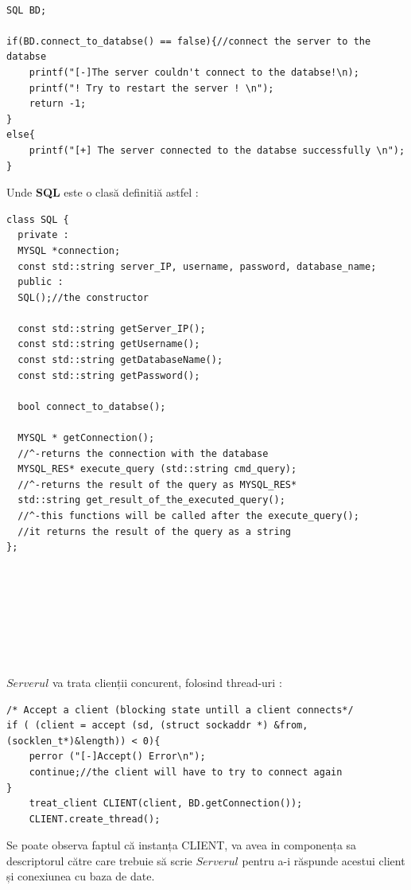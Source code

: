 \documentclass[runningheads]{llncs}
\begin{document}
\begin{verbatim} 

SQL BD;

if(BD.connect_to_databse() == false){//connect the server to the databse
    printf("[-]The server couldn't connect to the databse!\n);
    printf("! Try to restart the server ! \n");
    return -1;
}
else{
    printf("[+] The server connected to the databse successfully \n");
}
\end{verbatim} 
Unde \textbf{SQL} este o clasă definitiă astfel : 
\begin{verbatim}
class SQL {
  private :
  MYSQL *connection;
  const std::string server_IP, username, password, database_name;
  public :
  SQL();//the constructor
  
  const std::string getServer_IP();
  const std::string getUsername();
  const std::string getDatabaseName();
  const std::string getPassword();

  bool connect_to_databse();
  
  MYSQL * getConnection();
  //^-returns the connection with the database
  MYSQL_RES* execute_query (std::string cmd_query);
  //^-returns the result of the query as MYSQL_RES*
  std::string get_result_of_the_executed_query();
  //^-this functions will be called after the execute_query();
  //it returns the result of the query as a string
};
\end{verbatim}
 \\
  \\
   \\
    \\
     \\  
      \\
       \\
\hypertarget{sec:ServerCreateThread}{$Serverul $} va trata clienții concurent, folosind thread-uri : 
\begin{verbatim}
/* Accept a client (blocking state untill a client connects*/
if ( (client = accept (sd, (struct sockaddr *) &from, (socklen_t*)&length)) < 0){
    perror ("[-]Accept() Error\n");
    continue;//the client will have to try to connect again
}
    treat_client CLIENT(client, BD.getConnection());
    CLIENT.create_thread();
\end{verbatim}
Se poate observa faptul că instanța CLIENT, va avea in componența sa descriptorul către care trebuie să scrie $Serverul$ pentru a-i răspunde acestui client și conexiunea cu baza de date.
\end{document}
